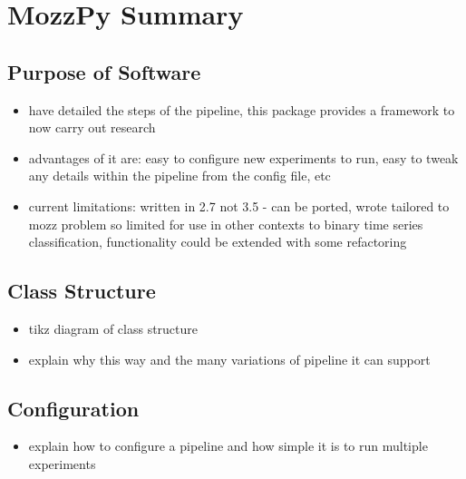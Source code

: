 \section{MozzPy Summary}
\label{sec:pl-mozzpy}

    \subsection{Purpose of Software}
    \label{subsec:pl-mozzpy-purp}
        \begin{itemize}
            \item{have detailed the steps of the pipeline, this package provides a framework to now carry out research}
            \item{advantages of it are: easy to configure new experiments to run, easy to tweak any details within the pipeline from the config file, etc}
            \item{current limitations: written in 2.7 not 3.5 - can be ported, wrote tailored to mozz problem so limited for use in other contexts to binary time series classification, functionality could be extended with some refactoring}
        \end{itemize}
    
    \subsection{Class Structure}
    \label{subsec:pl-mozzpy-struc}
        \begin{itemize}
            \item{tikz diagram of class structure}
            \item{explain why this way and the many variations of pipeline it can support}
        \end{itemize}
        
    \subsection{Configuration}
    \label{subsec:pl-mozzpy-conf}
        \begin{itemize}
            \item{explain how to configure a pipeline and how simple it is to run multiple experiments}
        \end{itemize}

